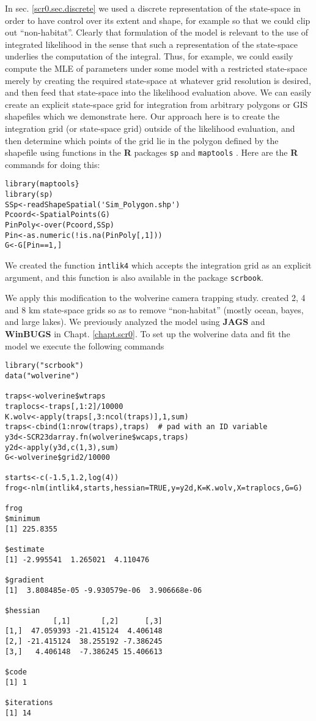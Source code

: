 In sec. \ref{scr0.sec.discrete} 
 we used a discrete representation of
the state-space in order to have control over its extent and shape,
for example so that we could clip out ``non-habitat''. Clearly that
formulation of the model is relevant to the use of integrated
likelihood in the sense that such a representation of the state-space
underlies the computation of the integral. Thus, for example, we could
easily compute the MLE of parameters under some model with a
restricted state-space merely by creating the required state-space at
whatever grid resolution is desired, and then feed that state-space
into the likelihood evaluation above. We can easily create an explicit
state-space grid for integration from arbitrary polygons or GIS
shapefiles  which we 
demonstrate here. Our approach here is to create the integration grid
(or state-space grid) outside of the likelihood evaluation, and then
determine which points of the grid lie in the polygon defined by the
shapefile using 
functions in the {\bf R} packages \mbox{\tt sp}  and
\mbox{\tt maptools}  .  Here
are the {\bf R} commands for doing this:  
{\small
\begin{verbatim}
library(maptools}
library(sp)
SSp<-readShapeSpatial('Sim_Polygon.shp')
Pcoord<-SpatialPoints(G)
PinPoly<-over(Pcoord,SSp)
Pin<-as.numeric(!is.na(PinPoly[,1]))
G<-G[Pin==1,]
\end{verbatim}
}
We created  the function \mbox{\tt intlik4} which accepts the integration
grid as an explicit argument, and this function is also available in
the package  \mbox{\tt scrbook}.

We apply this modification to the wolverine camera trapping
study. \citet{royle_etal:2011jwm} created 2, 4 and 8 km state-space
grids so as to remove ``non-habitat'' (mostly ocean, bayes, and large
lakes). We previously analyzed the model using {\bf JAGS} and {\bf WinBUGS} in
Chapt. \ref{chapt.scr0}.  To set up the wolverine data and fit the
model we execute the following commands
{\small 
\begin{verbatim}
library("scrbook")
data("wolverine")

traps<-wolverine$wtraps
traplocs<-traps[,1:2]/10000
K.wolv<-apply(traps[,3:ncol(traps)],1,sum)
traps<-cbind(1:nrow(traps),traps)  # pad with an ID variable
y3d<-SCR23darray.fn(wolverine$wcaps,traps)
y2d<-apply(y3d,c(1,3),sum)
G<-wolverine$grid2/10000

starts<-c(-1.5,1.2,log(4))
frog<-nlm(intlik4,starts,hessian=TRUE,y=y2d,K=K.wolv,X=traplocs,G=G)

frog
$minimum
[1] 225.8355

$estimate
[1] -2.995541  1.265021  4.110476

$gradient
[1]  3.808485e-05 -9.930579e-06  3.906668e-06

$hessian
           [,1]       [,2]      [,3]
[1,]  47.059393 -21.415124  4.406148
[2,] -21.415124  38.255192 -7.386245
[3,]   4.406148  -7.386245 15.406613

$code
[1] 1

$iterations
[1] 14
\end{verbatim}
}

